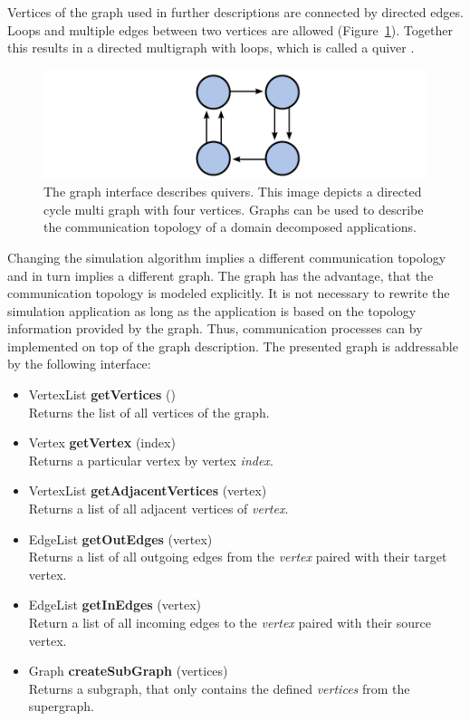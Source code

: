 Vertices of the graph used in further descriptions are connected by
directed edges.  Loops and multiple edges between two vertices are
allowed (Figure~\ref{fig:graph}). Together this results in a directed
multigraph with loops, which is called a quiver \cite{ref:quiver}.

\begin{figure}[H]
  \centering \includegraphics[width=\textwidth]{graphics/30_graph}
  \caption{The graph interface describes quivers. This image depicts a
    directed cycle multi graph with four vertices. Graphs can be used
    to describe the communication topology of a domain decomposed
    applications.}
  \label{fig:graph}
\end{figure}

\noindent Changing the simulation algorithm implies a different
communication topology and in turn implies a different graph. The
graph has the advantage, that the communication topology is
modeled explicitly. It is not necessary to rewrite the simulation
application as long as the application is based on the topology
information provided by the graph. Thus, communication processes can
by implemented on top of the graph description. The presented graph
is addressable by the following interface:

\begin{itemize}
  \item VertexList \textbf{getVertices} ()\\
    Returns the list of all vertices of the graph.
    
  \item  Vertex \textbf{getVertex} (index)\\
    Returns a particular vertex by vertex \textit{index}.

  \item  VertexList \textbf{getAdjacentVertices} (vertex)\\
    Returns a list of all adjacent vertices of \textit{vertex}.

  \item  EdgeList \textbf{getOutEdges} (vertex)\\
    Returns a list of all outgoing edges from the \textit{vertex}
    paired with their target vertex.

  \item  EdgeList \textbf{getInEdges} (vertex)\\
    Return a list of all incoming edges to the \textit{vertex}
    paired with their source vertex.

  \item  Graph \textbf{createSubGraph} (vertices)\\
    Returns a subgraph, that only contains the defined
    \textit{vertices} from the supergraph.
\end{itemize}

